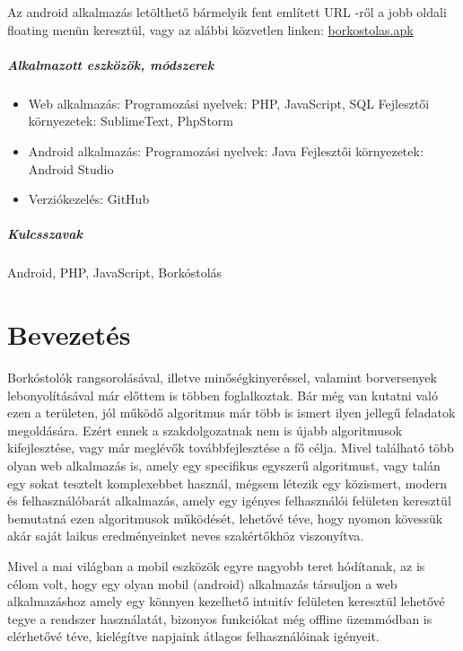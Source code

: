 \documentclass[12pt]{report}
\theoremstyle{definition}
\begin{document}
	Az android alkalmazás letölthető bármelyik fent említett URL -ről a jobb oldali floating menün keresztül, vagy az alábbi közvetlen linken: \href{http://bor.tvarga.hu/borkostolas.apk}{borkostolas.apk}
		
	\paragraph{Alkalmazott eszközök, módszerek}
	\begin{itemize}
		\item Web alkalmazás: 
		\subitem Programozási nyelvek: PHP, JavaScript, SQL
		\subitem Fejlesztői környezetek: SublimeText, PhpStorm
		\item Android alkalmazás:
		\subitem Programozási nyelvek: Java
		\subitem Fejlesztői környezetek: Android Studio
		\item Verziókezelés: GitHub
	\end{itemize}
	
	\paragraph{Kulcsszavak}
	Android, PHP, JavaScript, Borkóstolás
	
	\tableofcontents
	
	\chapter*{Bevezetés}
	
	Borkóstolók rangsorolásával, illetve minőségkinyeréssel, valamint borversenyek lebonyolításával már előttem is többen foglalkoztak. Bár még van kutatni való ezen a területen, jól működő algoritmus már több is ismert ilyen jellegű feladatok megoldására. Ezért ennek a szakdolgozatnak nem is újabb algoritmusok kifejlesztése, vagy már meglévők továbbfejlesztése a fő célja. Mivel található több olyan web alkalmazás is, amely egy specifikus egyszerű algoritmust, vagy talán egy sokat tesztelt komplexebbet használ, mégsem létezik egy közismert, modern és felhasználóbarát alkalmazás, amely egy igényes felhasználói felületen keresztül bemutatná ezen algoritmusok működését, lehetővé téve, hogy nyomon kövessük akár saját laikus eredményeinket neves szakértőkhöz viszonyítva.
	
	Mivel a mai világban a mobil eszközök egyre nagyobb teret hódítanak, az is célom volt, hogy egy olyan mobil (android) alkalmazás társuljon a web alkalmazáshoz amely egy könnyen kezelhető intuitív felületen keresztül lehetővé tegye a rendszer használatát, bizonyos funkciókat még offline üzemmódban is elérhetővé téve, kielégítve napjaink átlagos felhasználóinak igényeit. 
	
\end{document}
